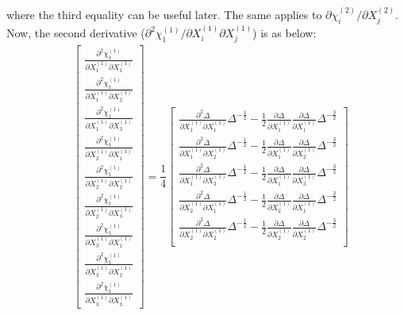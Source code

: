 \documentclass[12pt]{amsart}
\begin{document}
where the third equality can be useful later.
The same applies to $ \partial\chi^{(2)}_i/\partial X^{(2)}_j$.
Now, the second derivative ($\partial^2\chi_1^{(1)}/\partial X^{(1)}_i\partial X^{(1)}_j$) is as below:
\begin{equation}
  \label{eq:d2chi_dxdx}
  \begin{split}
    &\begin{bmatrix}
      \frac{\partial^2\chi^{(1)}_1}{\partial X^{(1)}_1\partial X^{(1)}_1}\\
      \frac{\partial^2\chi^{(1)}_1}{\partial X^{(1)}_1\partial X^{(1)}_2}\\
      \frac{\partial^2\chi^{(1)}_1}{\partial X^{(1)}_1\partial X^{(1)}_3}\\
      \frac{\partial^2\chi^{(1)}_1}{\partial X^{(1)}_2\partial X^{(1)}_1}\\
      \frac{\partial^2\chi^{(1)}_1}{\partial X^{(1)}_2\partial X^{(1)}_2}\\
      \frac{\partial^2\chi^{(1)}_1}{\partial X^{(1)}_2\partial X^{(1)}_3}\\
      \frac{\partial^2\chi^{(1)}_1}{\partial X^{(1)}_3\partial X^{(1)}_1}\\
      \frac{\partial^2\chi^{(1)}_1}{\partial X^{(1)}_3\partial X^{(1)}_2}\\
      \frac{\partial^2\chi^{(1)}_1}{\partial X^{(1)}_3\partial X^{(1)}_3}
    \end{bmatrix}
    =\dfrac{1}{4}
    \begin{bmatrix}
      \frac{\partial^2\Delta}{\partial X_1^{(1)} \partial X_1^{(1)}} \Delta^{-\frac{1}{2}} - \frac{1}{2}\frac{\partial\Delta}{\partial X_1^{(1)}} \frac{\partial\Delta}{\partial X_1^{(1)}} \Delta^{-\frac{3}{2}}\\
      \frac{\partial^2\Delta}{\partial X_1^{(1)} \partial X_2^{(1)}} \Delta^{-\frac{1}{2}} - \frac{1}{2}\frac{\partial\Delta}{\partial X_1^{(1)}} \frac{\partial\Delta}{\partial X_2^{(1)}} \Delta^{-\frac{3}{2}}\\
      \frac{\partial^2\Delta}{\partial X_1^{(1)} \partial X_3^{(1)}} \Delta^{-\frac{1}{2}} - \frac{1}{2}\frac{\partial\Delta}{\partial X_1^{(1)}} \frac{\partial\Delta}{\partial X_3^{(1)}} \Delta^{-\frac{3}{2}}\\
      \frac{\partial^2\Delta}{\partial X_2^{(1)} \partial X_1^{(1)}} \Delta^{-\frac{1}{2}} - \frac{1}{2}\frac{\partial\Delta}{\partial X_2^{(1)}} \frac{\partial\Delta}{\partial X_1^{(1)}} \Delta^{-\frac{3}{2}}\\
      \frac{\partial^2\Delta}{\partial X_2^{(1)} \partial X_2^{(1)}} \Delta^{-\frac{1}{2}} - \frac{1}{2}\frac{\partial\Delta}{\partial X_2^{(1)}} \frac{\partial\Delta}{\partial X_2^{(1)}} \Delta^{-\frac{3}{2}}\\

\end{bmatrix}
\end{split}
\end{equation}
\end{document}
